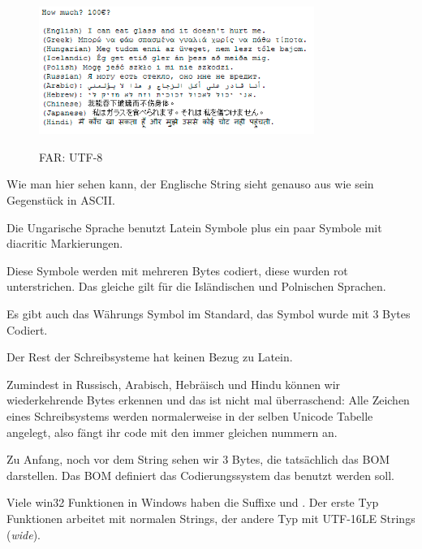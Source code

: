 \begin{figure}[H]
\centering
\includegraphics[width=0.8\textwidth]{digging_into_code/strings/multilang_sampler.png}
\end{figure}

\begin{figure}[H]
\centering
{}
\caption{FAR: UTF-8}
\end{figure}

Wie man hier sehen kann, der Englische String sieht genauso aus wie sein Gegenst\"uck in ASCII.

Die Ungarische Sprache benutzt Latein Symbole plus ein paar Symbole mit diacritic Markierungen.

Diese Symbole werden mit mehreren Bytes codiert, diese wurden rot unterstrichen.
Das gleiche gilt f\"ur die Isl\"andischen und Polnischen Sprachen.

Es gibt auch das  W\"ahrungs Symbol im Standard, das Symbol wurde mit 3 Bytes Codiert.

Der Rest der Schreibsysteme hat keinen Bezug zu Latein.

Zumindest in Russisch, Arabisch, Hebr\"aisch und Hindu k\"onnen wir wiederkehrende Bytes erkennen und das ist nicht mal \"uberraschend:
Alle Zeichen eines Schreibsystems werden normalerweise in der selben Unicode Tabelle angelegt, also f\"angt ihr code mit den 
immer gleichen nummern an. %

Zu Anfang, noch vor dem  String sehen wir 3 Bytes, die tats\"achlich das \ac{BOM} darstellen.
Das \ac{BOM} definiert das Codierungssystem das benutzt werden soll.


Viele win32 Funktionen in Windows haben die Suffixe  und . 
Der erste Typ Funktionen arbeitet mit normalen Strings, der andere Typ mit 
UTF-16LE Strings (\emph{wide}). 

